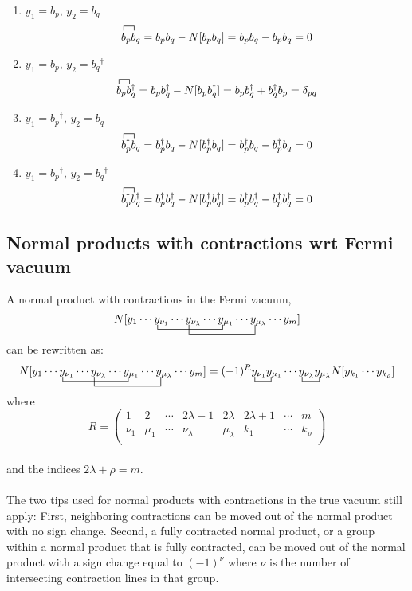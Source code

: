 \documentclass{article}
\newcommand{\ctr}{\bcontraction}
\newcommand{\fctr}{\contraction}
\newcommand{\dg}{\ensuremath{^\dagger} }
\newcommand{\cd}{\ensuremath{\cdots} }
\begin{document}
\begin{enumerate}
\item $y_1 = b_p$, $y_2 = b_q$ \\
$$
\fctr{}{b}{{}_p}{b}
b_p b_q = b_p b_q  - N[b_p b_q] = b_p b_q  - b_p b_q  = 0 
$$
\item $y_1 = b_p$, $y_2 = b_q\dg$ \\
$$
\fctr{}{b}{{}_p}{b}
b_p b_q\dg = b_p b_q\dg  - N[b_p b_q\dg] = b_p b_q\dg  +  b_q\dg b_p = \delta_{pq}
$$
\item $y_1 = b_p\dg$, $y_2 = b_q$ \\
$$
\fctr{}{b}{{}_p}{b}
b_p\dg b_q = b_p\dg b_q  - N[b_p\dg b_q] = b_p\dg b_q  - b_p\dg b_q  = 0 
$$
\item $y_1 = b_p\dg$, $y_2 = b_q\dg$ \\
$$
\fctr{}{b}{{}_p}{b}
b_p\dg b_q\dg = b_p\dg b_q\dg  - N[b_p\dg b_q\dg] = b_p\dg b_q\dg  - b_p\dg b_q\dg  = 0 
$$
\end{enumerate}

\subsection{Normal products with contractions wrt Fermi vacuum}
A normal product with contractions in the Fermi vacuum,
\[ 
\ctr{N[y_1 \cd }{x}{{}_{\nu_1} \cd y_{\nu_\lambda} \cd }{x}
\ctr[2ex]{N[y_1 \cd y_{\nu_1} \cd}{ x}{{}_{\nu_\lambda} \cd y_{\mu_1} \cd }{x} 
N[y_1 \cd y_{\nu_1} \cd y_{\nu_\lambda} \cd y_{\mu_1} \cd y_{\mu_\lambda} \cd y_m] 
\] 
can be rewritten as: 
\[ 
\ctr{N[y_1 \cd }{x}{{}_{\nu_1} \cd y_{\nu_\lambda} \cd }{x}
\ctr[2ex]{N[y_1 \cd y_{\nu_1} \cd}{ x}{{}_{\nu_\lambda} \cd y_{\mu_1} \cd }{x} 
N[y_1 \cd y_{\nu_1} \cd y_{\nu_\lambda} \cd y_{\mu_1} \cd y_{\mu_\lambda} \cd y_m] 
= 
\ctr{(-1)^R}{x}{{}_{\nu_1} }{x}
\ctr{(-1)^R y_{\nu_1}y_{\mu_1} \cd}{x}{{}_{\nu_\lambda} }{x}
(-1)^R y_{\nu_1}y_{\mu_1} \cd y_{\nu_\lambda} y_{\mu_\lambda} N[y_{k_1} \cd y_{k_\rho}]
\] 
where 
\[
R = 
\begin{pmatrix}
1 & 2 & \cd & 2\lambda -1 & 2\lambda & 2\lambda + 1&\cd & m  \\
\nu_1 & \mu_1 & \cd& \nu_\lambda & \mu_\lambda  &k_1 & \cd & k_\rho \\
\end{pmatrix}
\] \\
and the indices $2\lambda + \rho = m$.
\\ \\
The two tips used for normal products with contractions in the true vacuum still apply:
First, neighboring contractions can be moved out of the normal product with no sign change.
Second, a fully contracted normal product, or a group within a normal product that is fully contracted, 
can be moved out of the normal product with a sign change equal to $(-1)^\nu$ where $\nu$ is the number of intersecting contraction lines 
in that group. 
\end{document}
